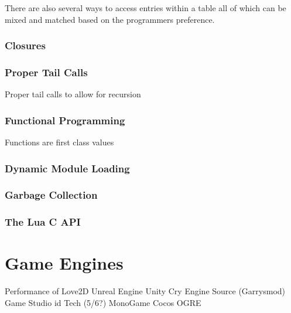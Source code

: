 \documentclass[11pt,a4paper,titlepage]{article}
\begin{document}
	

	There are also several ways to access entries within a table all of which can be mixed and matched based on the programmers preference.

	

\subsubsection{Closures}

\subsubsection{Proper Tail Calls}
Proper tail calls to allow for recursion

\subsubsection{Functional Programming}
Functions are first class values

\subsubsection{Dynamic Module Loading}

\subsubsection{Garbage Collection}

\subsubsection{The Lua C API}

\newpage
\section{Game Engines}
	
		Performance of
			Love2D
			Unreal 
			Engine 
			Unity 
			Cry Engine 
			Source (Garrysmod)
			Game Studio
			id Tech (5/6?)
			MonoGame
			Cocos
			OGRE
			
\newpage
\printbibliography{}
\end{document}

